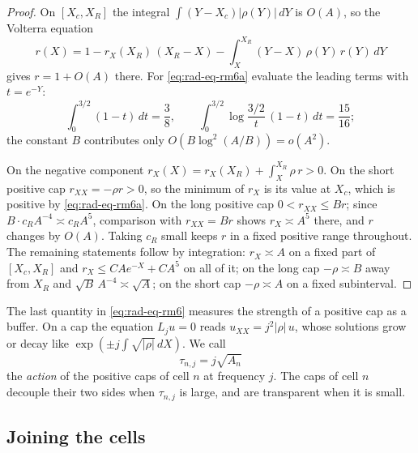 \begin{proof}
On $[X_c,X_R]$ the integral $\int(Y-X_c)|\rho(Y)|\,dY$ is $O(A)$, so
the Volterra equation
\[
 r(X)=1-r_X(X_R)\,(X_R-X)
       -\int_X^{X_R}(Y-X)\,\rho(Y)\,r(Y)\,dY
\]
gives $r=1+O(A)$ there. For \eqref{eq:rad-eq-rm6a} evaluate the leading
terms with $t=e^{-Y}$:
\[
 \int_0^{3/2}(1-t)\,dt=\frac38,\qquad
 \int_0^{3/2}\log\frac{3/2}{t}\,(1-t)\,dt=\frac{15}{16};
\]
the constant $B$ contributes only $O(B\log^2(A/B))=o(A^2)$.

On the negative component $r_X(X)=r_X(X_R)+\int_X^{X_R}\rho\,r>0$. On
the short positive cap $r_{XX}=-\rho r>0$, so the minimum of $r_X$ is
its value at $X_c$, which is positive by \eqref{eq:rad-eq-rm6a}. On
the long positive cap $0<r_{XX}\le Br$; since
$B\cdot c_RA^{-4}\asymp c_RA^5$, comparison with $r_{XX}=Br$ shows
$r_X\asymp A^5$ there, and $r$ changes by $O(A)$. Taking $c_R$ small
keeps $r$ in a fixed positive range throughout. The remaining
statements follow by integration: $r_X\asymp A$ on a fixed part of
$[X_c,X_R]$ and $r_X\le CAe^{-X}+CA^5$ on all of it; on the long cap
$-\rho\asymp B$ away from $X_R$ and $\sqrt B\,A^{-4}\asymp\sqrt A$; on
the short cap $-\rho\asymp A$ on a fixed subinterval.
\end{proof}

The last quantity in \eqref{eq:rad-eq-rm6} measures the strength of a
positive cap as a buffer. On a cap the equation $L_ju=0$ reads
$u_{XX}=j^2|\rho|\,u$, whose solutions grow or decay like
$\exp(\pm j\int\sqrt{|\rho|}\,dX)$. We call
\begin{equation}\label{eq:cap-action}
 \tau_{n,j}=j\sqrt{A_n}
\end{equation}
the \emph{action} of the positive caps of cell $n$ at frequency $j$.
The caps of cell $n$ decouple their two sides when $\tau_{n,j}$ is
large, and are transparent when it is small.

\subsection{Joining the cells}
\label{subsec:joins}

